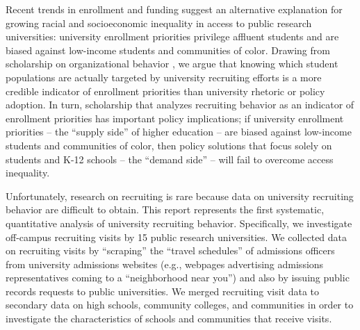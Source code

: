 \documentclass[twoside]{article}
\begin{document}
Recent trends in enrollment and funding suggest an alternative explanation for growing racial and socioeconomic inequality in access to public  research universities: university enrollment priorities privilege affluent students and are biased against low-income students and communities of color. Drawing from scholarship on organizational behavior \citep[e.g., ][]{RN513,RN531,RN1714}, we argue that knowing which student populations are actually targeted by university recruiting efforts is a more credible indicator of enrollment priorities than university rhetoric or policy adoption. In turn, scholarship that analyzes recruiting behavior as an indicator of enrollment priorities has important policy implications; if university enrollment priorities -- the ``supply side'' of higher education -- are biased against low-income students and communities of color, then policy solutions that focus solely on students and K-12 schools -- the ``demand side'' -- will fail to overcome access inequality.

Unfortunately, research on recruiting is rare because data on university recruiting behavior are difficult to obtain.  This report represents the first systematic, quantitative analysis of university recruiting behavior. Specifically, we investigate off-campus recruiting visits by 15 public research universities.  We collected data on recruiting visits by ``scraping'' the ``travel schedules'' of admissions officers from university admissions websites (e.g., webpages advertising admissions representatives coming to a ``neighborhood near you'') and also by issuing public records requests to public universities.  We merged recruiting visit data to secondary data on high schools, community colleges, and communities in order to investigate the characteristics of schools and communities that receive visits.
\end{document}
